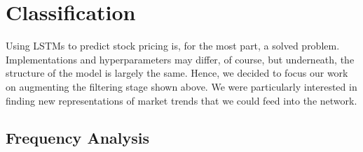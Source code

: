 \documentclass[final]{article}
\begin{document}
\section{Classification}
Using LSTMs to predict stock pricing is, for the most part, a solved
problem. Implementations and hyperparameters may differ, of course,
but underneath, the structure of the model is largely the same. Hence,
we decided to focus our work on augmenting the filtering stage shown
above. We were particularly interested in finding new representations
of market trends that we could feed into the network.


\subsection{Frequency Analysis}
\end{document}
